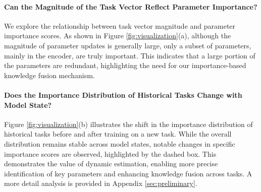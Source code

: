 \paragraph{Can the Magnitude of the Task Vector Reflect Parameter Importance?}
We explore the relationship between task vector magnitude and parameter importance scores. As shown in Figure \ref{fig:visualization}(a), although the magnitude of parameter updates is generally large, only a subset of parameters, mainly in the encoder, are truly important.
This indicates that a large portion of the parameters are redundant, highlighting the need for our importance-based knowledge fusion mechanism.


\paragraph{Does the Importance Distribution of Historical Tasks Change with Model State?}
Figure \ref{fig:visualization}(b) illustrates the shift in the importance distribution of historical tasks before and after training on a new task. 
While the overall distribution remains stable across model states, notable changes in specific importance scores are observed, highlighted by the dashed box. This demonstrates the value of dynamic estimation, enabling more precise identification of key parameters and enhancing knowledge fusion across tasks.
A more detail analysis is provided in Appendix \ref{sec:preliminary}.








